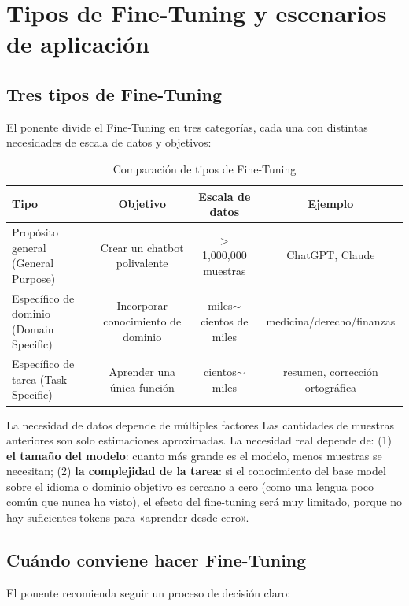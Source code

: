 \documentclass[a4paper]{article}
\begin{document}
\newpage
\section{Tipos de Fine-Tuning y escenarios de aplicación}

\subsection{Tres tipos de Fine-Tuning}

El ponente divide el Fine-Tuning en tres categorías, cada una con distintas necesidades de escala de datos y objetivos:

\begin{table}[H]
\centering
\caption{Comparación de tipos de Fine-Tuning}
\begin{tabular}{lccc}
\toprule
\textbf{Tipo} & \textbf{Objetivo} & \textbf{Escala de datos} & \textbf{Ejemplo} \\
\midrule
Propósito general (General Purpose) & Crear un chatbot polivalente & $>$1,000,000 muestras & ChatGPT, Claude \\
Específico de dominio (Domain Specific) & Incorporar conocimiento de dominio & miles$\sim$cientos de miles & medicina/derecho/finanzas \\
Específico de tarea (Task Specific) & Aprender una única función & cientos$\sim$miles & resumen, corrección ortográfica \\
\bottomrule
\end{tabular}
\end{table}

\begin{warningbox}{La necesidad de datos depende de múltiples factores}
Las cantidades de muestras anteriores son solo estimaciones aproximadas. La necesidad real depende de: (1) \textbf{el tamaño del modelo}: cuanto más grande es el modelo, menos muestras se necesitan; (2) \textbf{la complejidad de la tarea}: si el conocimiento del base model sobre el idioma o dominio objetivo es cercano a cero (como una lengua poco común que nunca ha visto), el efecto del fine-tuning será muy limitado, porque no hay suficientes tokens para «aprender desde cero».
\end{warningbox}

\subsection{Cuándo conviene hacer Fine-Tuning}

El ponente recomienda seguir un proceso de decisión claro:
\end{document}
